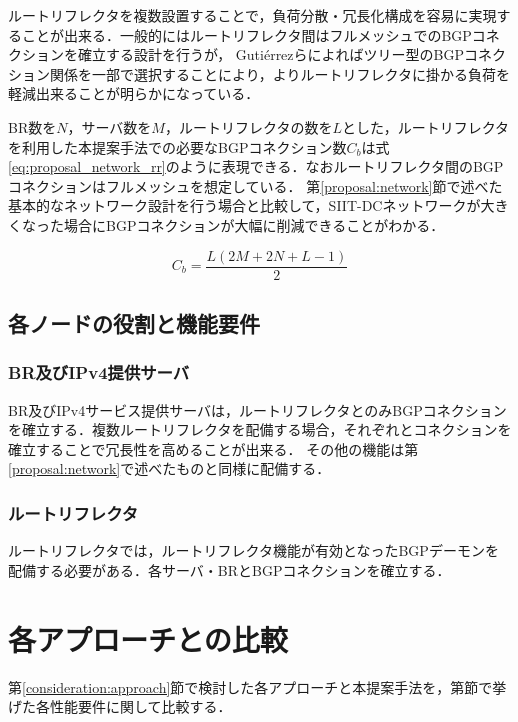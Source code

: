 {ルートリフレクタを複数設置することで，負荷分散・冗長化構成を容易に実現することが出来る．一般的にはルートリフレクタ間はフルメッシュでのBGPコネクションを確立する設計を行うが，
Gutiérrezらによればツリー型のBGPコネクション関係を一部で選択することにより，よりルートリフレクタに掛かる負荷を軽減出来ることが明らかになっている\cite{6838346}．

BR数を$N$，サーバ数を$M$，ルートリフレクタの数を$L$とした，ルートリフレクタを利用した本提案手法での必要なBGPコネクション数$C_b$は式\ref{eq:proposal_network_rr}のように表現できる．なおルートリフレクタ間のBGPコネクションはフルメッシュを想定している．
第\ref{proposal:network}節で述べた基本的なネットワーク設計を行う場合と比較して，SIIT-DCネットワークが大きくなった場合にBGPコネクションが大幅に削減できることがわかる．


\begin{equation}
    C_b = \frac{L(2M + 2N + L - 1)}{2}
    \label{eq:proposal_network_rr}
\end{equation}

\subsection{各ノードの役割と機能要件}
\subsubsection{BR及びIPv4提供サーバ}
BR及びIPv4サービス提供サーバは，ルートリフレクタとのみBGPコネクションを確立する．複数ルートリフレクタを配備する場合，それぞれとコネクションを確立することで冗長性を高めることが出来る．
その他の機能は第\ref{proposal:network}で述べたものと同様に配備する．

\subsubsection{ルートリフレクタ}
ルートリフレクタでは，ルートリフレクタ機能が有効となったBGPデーモンを配備する必要がある．各サーバ・BRとBGPコネクションを確立する．


\section{各アプローチとの比較}
\label{proposal:compare}
第\ref{consideration:approach}節で検討した各アプローチと本提案手法を，第\label{consideration:points}節で挙げた各性能要件に関して比較する．


}

